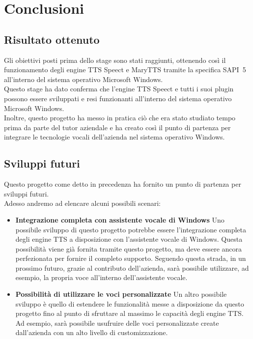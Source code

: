 \chapter{Conclusioni}
\thispagestyle{empty}

\newpage

\section{Risultato ottenuto}
Gli obiettivi posti prima dello stage sono stati raggiunti, ottenendo così il funzionamento degli engine TTS Speect e MaryTTS tramite la specifica SAPI~5 all'interno del sistema operativo Microsoft Windows.\\
Questo stage ha dato conferma che l'engine TTS Speect e tutti i suoi plugin possono essere sviluppati e resi funzionanti all'interno del sistema operativo Microsoft Windows.\\
Inoltre, questo progetto ha messo in pratica ciò che era stato studiato tempo prima da parte del tutor aziendale e ha creato così il punto di partenza per integrare le tecnologie vocali dell'azienda nel sistema operativo Windows.

\section{Sviluppi futuri}
Questo progetto come detto in precedenza ha fornito un punto di partenza per sviluppi futuri.\\
Adesso andremo ad elencare alcuni possibili scenari:
\begin{itemize}
	\item \textbf{Integrazione completa con assistente vocale di Windows} Uno possibile sviluppo di questo progetto potrebbe essere l'integrazione completa degli engine TTS a disposizione con l'assistente vocale di Windows. Questa possibilità viene già fornita tramite questo progetto, ma deve essere ancora perfezionata per fornire il completo supporto.
	Seguendo questa strada, in un prossimo futuro, grazie al contributo dell'azienda, sarà possibile utilizzare, ad esempio, la propria voce all'interno dell'assistente vocale.
	\item \textbf{Possibilità di utilizzare le voci personalizzate} Un altro possibile sviluppo è quello di estendere le funzionalità messe a disposizione da questo progetto fino al punto di sfruttare al massimo le capacità degli engine TTS.
	Ad esempio, sarà possibile usufruire delle voci personalizzate create dall'azienda con un alto livello di customizzazione.
\end{itemize}

